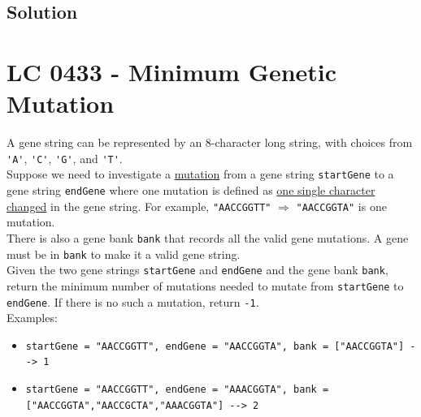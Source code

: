 \subsection*{Solution}

\section{LC 0433 - Minimum Genetic Mutation}
A gene string can be represented by an 8-character long string, with choices from {\colorbox{CodeBackground}{\lstinline|'A'|}}, {\colorbox{CodeBackground}{\lstinline|'C'|}}, {\colorbox{CodeBackground}{\lstinline|'G'|}}, and {\colorbox{CodeBackground}{\lstinline|'T'|}}.\\

Suppose we need to investigate a \ul{mutation} from a gene string {\colorbox{CodeBackground}{\lstinline|startGene|}} to a gene string {\colorbox{CodeBackground}{\lstinline|endGene|}} where one mutation is defined as \ul{one single character changed} in the gene string. For example, {\colorbox{CodeBackground}{\lstinline|"AACCGGTT"|}} $\Rightarrow$ {\colorbox{CodeBackground}{\lstinline|"AACCGGTA"|}} is one mutation.\\

There is also a gene bank {\colorbox{CodeBackground}{\lstinline|bank|}} that records all the valid gene mutations. A gene must be in {\colorbox{CodeBackground}{\lstinline|bank|}} to make it a valid gene string.\\

Given the two gene strings {\colorbox{CodeBackground}{\lstinline|startGene|}} and {\colorbox{CodeBackground}{\lstinline|endGene|}} and the gene bank {\colorbox{CodeBackground}{\lstinline|bank|}}, return the minimum number of mutations needed to mutate from {\colorbox{CodeBackground}{\lstinline|startGene|}} to {\colorbox{CodeBackground}{\lstinline|endGene|}}. If there is no such a mutation, return {\colorbox{CodeBackground}{\lstinline|-1|}}.\\

Examples:
\begin{itemize}
	\item {\colorbox{CodeBackground}{\lstinline|startGene = "AACCGGTT", endGene = "AACCGGTA", bank = ["AACCGGTA"] --> 1|}}
	\item {\colorbox{CodeBackground}{\lstinline|startGene = "AACCGGTT", endGene = "AAACGGTA", bank = ["AACCGGTA","AACCGCTA","AAACGGTA"] --> 2|}}
\end{itemize}

